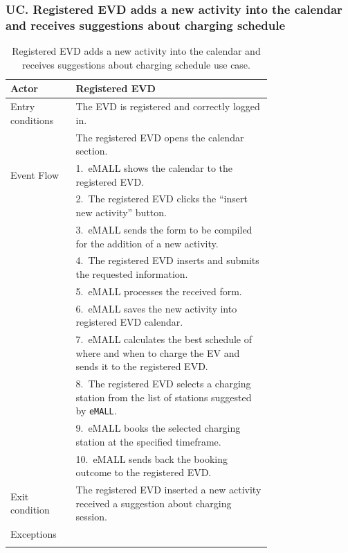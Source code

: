\subsubsection*{UC\cuc . Registered EVD adds a new activity into the calendar and receives suggestions about charging schedule}
\begin{center}
    \begin{longtable}{lp{0.75\linewidth}}
        \hline
        Actor            & Registered EVD                                                                                                \\
        \hline
        Entry conditions & The EVD is registered and correctly logged in.                                                                \\
        & The registered EVD opens the calendar section.                                                                \\
        \hline
        Event Flow       & 1.\ eMALL shows the calendar to the registered EVD.                                                           \\
        & 2.\ The registered EVD clicks the ``insert new activity'' button.                                             \\
        & 3.\ eMALL sends the form to be compiled for the addition of a new activity.                                   \\
        & 4.\ The registered EVD inserts and submits the requested information.                                         \\
        & 5.\ eMALL processes the received form.                                                                        \\
        & 6.\ eMALL saves the new activity into registered EVD calendar.                                                \\
        & 7.\ eMALL calculates the best schedule of where and when to charge the EV and sends it to the registered EVD. \\
        & 8.\ The registered EVD selects a charging station from the list of stations suggested by \verb|eMALL|.        \\
        & 9.\ eMALL books the selected charging station at the specified timeframe.                                     \\
        & 10.\ eMALL sends back the booking outcome to the registered EVD.                                              \\
        \hline
        Exit condition   & The registered EVD inserted a new activity received a suggestion about charging session.                      \\
        \hline
        Exceptions       &                                                                                                               \\
        \hline
        \caption{Registered EVD adds a new activity into the calendar and receives suggestions about charging schedule use case.}
        \label{tab: EVD_adds_activity_calendar_use_case}
    \end{longtable}


\end{center}
